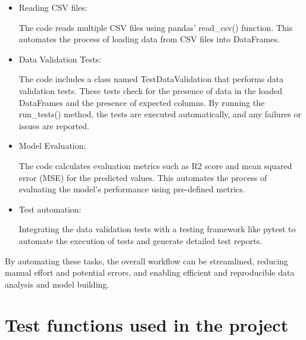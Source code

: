 		\begin{itemize}
			
		\item Reading CSV files: 
		
		The code reads multiple CSV files using pandas' read\_csv() function. This automates the process of loading data from CSV files into DataFrames.
		
		\item Data Validation Tests:
		
		The code includes a class named TestDataValidation that performs data validation tests. These tests check for the presence of data in the loaded DataFrames and the presence of expected columns. By running the run\_tests() method, the tests are executed automatically, and any failures or issues are reported.
		
		\item Model Evaluation: 
		
		The code calculates evaluation metrics such as R2 score and mean squared error (MSE) for the predicted values. This automates the process of evaluating the model's performance using pre-defined metrics.
		
		
		\item Test automation: 
		
		Integrating the data validation tests with a testing framework like pytest to automate the execution of tests and generate detailed test reports.
		
		\end{itemize}

	By automating these tasks, the overall workflow can be streamlined, reducing manual effort and potential errors, and enabling efficient and reproducible data analysis and model building.
	
	\section{Test functions used in the project}
	
